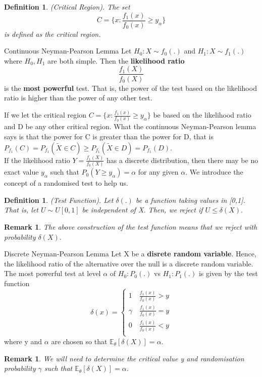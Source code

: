 \documentclass[twoside]{article}
\newtheorem{definition}[theorem]{Definition}
\newtheorem{remark}[theorem]{Remark}
\begin{document}
\begin{definition}(Critical Region). The set 
$$
C = \{x: \frac{f_1(x)}{f_0(x)} \geq y_{\alpha}\}
$$
is defined as the critical region.

\end{definition}

\begin{theorem_exam}{Continuous Neyman-Pearson Lemma}{} Let $H_0: X \sim f_0(.)$ and $H_1: X \sim f_1(.)$ where $H_0, H_1$ are both simple. Then the \textbf{likelihood ratio} 
$$
\frac{f_1(X)}{f_0(X)}
$$
is the \textbf{most powerful} test. That is, the power of the test based on the likelihood ratio is higher than the power of any other test.
\end{theorem_exam}

If we let the critical region $C = \{x: \frac{f_1(x)}{f_0(x)} \geq y_{\alpha}\}$ be based on the likelihood ratio and D be any other critical region. What the continuous Neyman-Pearson lemma says is that the power for C is greater than the power for D, that is $P_{f_{1}}(C) = P_{f_{1}}(\tilde{X} \in C) \geq P_{f_{1}}(\tilde{X} \in D) = P_{f_{1}}(D).$\\

If the likelihood ratio $Y = \frac{f_1(X)}{f_0(X)}$ has a discrete distribution, then there may be no exact value $y_{\alpha}$ such that $P_0(Y \geq y_{\alpha}) = \alpha$ for any given $\alpha.$ We introduce the concept of a randomised test to help us.

\begin{definition}(Test Function). Let $\delta(.)$ be a function taking values in [0,1]. That is, let $U \sim U[0,1]$ be independent of X. Then, we reject if $U \leq \delta(X).$
\end{definition}

\begin{remark}The above construction of the test function means that we reject with probability $\delta(X).$
\end{remark}

\begin{theorem_exam}{Discrete Neyman-Pearson Lemma}{} Let X be a \textbf{disrete random variable}. Hence, the likelihood ratio of the alternative over the null is a discrete random variable. The most powerful test at level $\alpha$ of $H_0: P_0(.)$ vs $H_1: P_1(.)$ is given by the test function 
$$
\delta(x) = 
\begin{cases}
1 \quad \frac{f_1(x)}{f_0(x)} > y \\
\gamma \quad \frac{f_1(x)}{f_0(x)} = y \\
0 \quad \frac{f_1(x)}{f_0(x)} < y \\
\end{cases}
$$
where y and $\alpha$ are chosen so that $\mathbb{E}_{\theta}[\delta(X)] = \alpha.$ 
\end{theorem_exam}\begin{remark}We will need to determine the critical value y and randomisation probability $\gamma$ such that $\mathbb{E}_{\theta}[\delta(X)] = \alpha.$ 
\end{remark}
\end{document}
